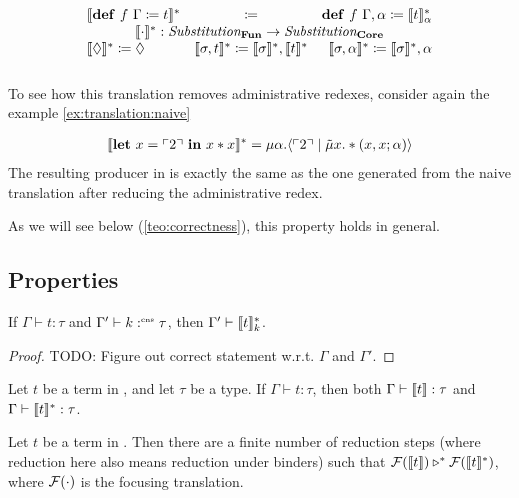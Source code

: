 \[\begin{array}{rcl rcl}
    \multicolumn{2}{r}{\translatestar{\defi{f\ \Gamma}{t}}{}} & \multicolumn{2}{c}{\coloneq} & \multicolumn{2}{l}{\defi{f\ \Gamma, \alpha}{\translatestar{t}{\alpha}}}
    \\
    \multicolumn{6}{c}{\translatestar{\cdot{}}{}{}:\emph{Substitution}_{\surfacelang{}}\rightarrow\emph{Substitution}_{\targetlang{}}}\\
    \multicolumn{2}{l}{\translatestar{\nil}{} \coloneq \nil} &
    \multicolumn{2}{c}{\translatestar{\sigma,t}{} \coloneq \translatestar{\sigma}{},\translatestar{t}{}} &
    \multicolumn{2}{r}{\translatestar{\sigma,\alpha}{} \coloneq \translatestar{\sigma}{},\alpha}\\
    \\
  \end{array}
\]
To see how this translation removes administrative redexes, consider again the example \cref{ex:translation:naive}
\begin{example}
  \begin{align*}
    \llbracket \mathbf{let}\ x = \ulcorner 2 \urcorner\ \mathbf{in}\ x*x \rrbracket^* = \mu\alpha.\langle \ulcorner 2 \urcorner \mid \tilde\mu x.*(x,x;\alpha) \rangle
  \end{align*}
  The resulting producer in \targetlang{} is exactly the same as the one generated from the naive translation after reducing the administrative redex.
\end{example}
As we will see below (\cref{teo:correctness}), this property holds in general.

\subsection{Properties}
\label{subsec:translation:properties}

\begin{lemma}
  If $\Gamma \vdash t : \tau$ and $\Gamma' \vdash k :^{\text{\tiny cns}} \tau$, then $\Gamma' \vdash \llbracket t \rrbracket_{k}^{\ast}$.
\end{lemma}
\begin{proof}
  TODO: Figure out correct statement w.r.t. $\Gamma$ and $\Gamma'$.
\end{proof}

\begin{theorem}
  Let $t$ be a term in \surfacelang, and let $\tau$ be a type.
  If $\Gamma \vdash t: \tau$, then both $\Gamma \vdash \llbracket t \rrbracket : \tau$ and $\Gamma \vdash \llbracket t \rrbracket_{}^{\ast} : \tau$.
\end{theorem}

\begin{theorem}[Correctness]
  \label{teo:correctness}
  Let $t$ be a term in \surfacelang. Then there are a finite number of reduction steps (where reduction here also means reduction under binders) such that $\mathcal{F}(\llbracket t \rrbracket) \triangleright^{\ast} \mathcal{F}(\llbracket t \rrbracket_{}^{\ast})$, where $\mathcal{F}(\cdot)$ is the focusing translation.
\end{theorem}
